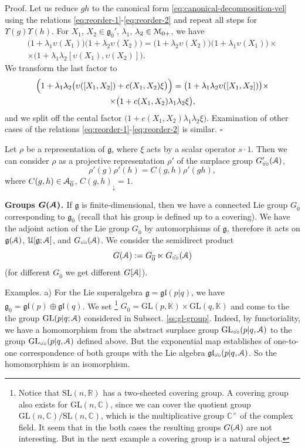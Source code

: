 \documentclass[]{amsart}
\newcounter{sec}
\newcounter{punct}[sec]
\def\punct{\refstepcounter{punct}{\arabic{sec}.\arabic{punct}.  }}
\def\SL{\mathrm {SL}}
\def\GL{\mathrm  {GL}}
\def\cA{\EuScript A}
\def\cM{\EuScript M}
\def\cU{\EuScript U}
\def\frg{\mathfrak g}
\def\frl{\mathfrak l}
\def\R {{\mathbb R }}
\def\C {{\mathbb C }}
\def\K{{\mathbb K}}
\def\ov{\overline}
\def\sm{\smallskip}
\def\0{{\ov 0}}
\def\vel{{\check{\circ\circ}}}
\begin{document}
 {\sc Proof.}  Let us reduce $gh$ to the canonical form \eqref{eq:canonical-decomposition-vel}
 using the relations \eqref{eq:reorder-1}-\eqref{eq:reorder-2} and repeat all steps for 
 $\Upsilon(g)\Upsilon(h)$. For $X_1$, $X_2\in \frg_\0'$, $\lambda_1$, $\lambda_2\in\cM_{0+}$,
    we have 
 \begin{multline*}
 	\bigl(1+\lambda_1\upsilon(X_1)\bigr)\bigl(1+\lambda_2\upsilon(X_2)\bigr)  =\bigl(1+\lambda_2\upsilon(X_2)\bigr)\bigl(1+\lambda_1\upsilon(X_1)\bigr)
 	\times\\\times 
 \bigl(1+\lambda_1\lambda_2[\upsilon(X_1),\upsilon(X_2)]\bigr).
 \end{multline*}
 We transform the last factor to
 \begin{multline*}
 \Bigl(1+\lambda_1\lambda_2\bigl(\upsilon ([X_1,X_2])+c(X_1,X_2)\xi\bigr)\Bigr)=
  \bigl(1+\lambda_1\lambda_2 \upsilon([X_1,X_2])\bigr) 
  \times\\ \times \bigl(1+c(X_1,X_2)\lambda_1\lambda_2\xi\bigr),
 \end{multline*}
and we split off the cental factor $\bigl(1+c(X_1,X_2)\lambda_1\lambda_2\xi\bigr)$.
Examination of other cases of the relations  \eqref{eq:reorder-1}-\eqref{eq:reorder-2}
is similar.
\hfill $\square$



\sm

Let $\rho$ be a representation of $\frg$, where $\xi$ acts by a scalar operator $s\cdot 1$. 
Then we can  consider  
$\rho$ as a projective representation $\rho'$ of the surplace group $G'_\vel(\cA)$,
$$
\rho'(g)\rho'(h)=C(g,h)\rho'(gh),
$$ 
where $C(g,h)\in \cA_\0$, $C(g,h)_\downarrow=1$.

\sm

{\bf\punct Groups $\boldsymbol{G(\cA)}$.%
\label{ss:supergroups}} If $\frg$ is finite-dimensional, then we 
have a connected Lie group $G_\0$ corresponding to $\frg_\0$
(recall that his group
is defined up to a covering). 
 We have the adjoint action of the Lie group $G_\0$  by automorphisms of 
 $\frg$, therefore it acts on $\frg(\cA)$, $\cU[\frg;\cA]$,
 and
  $G_\vel(\cA)$. We consider
the semidirect product
$$
G(\cA):=G_\0\ltimes G_\vel(\cA)
$$
(for different $G_\0$ we get different 
$G[\cA]$).




\sm

{\sc Examples.} a) For the Lie superalgebra
$\frg=\frg\frl(p|q)$, we have $\frg_\0=\frg\frl(p)\oplus \frg\frl(q)$.
We set%
\footnote{Notice  that $\SL(n,\R)$ has a two-sheeted covering group.
A covering group also exists for $\GL(n,\C)$, since we can cover 
the quotient group
$\GL(n,\C)/\SL(n,\C)$, which is the multiplicative group
$\C^\times$ of the complex field. It seem that in the  both cases
the resulting groups $G(\cA)$ 
are not interesting. But in the next example a covering group
is a natural object.}
 $G_\0=\GL(p,\K)\times \GL(q,\K)$ and come to the
 the group $\GL(p|q;\cA)$
considered in Subsect. \ref{ss:gl-group}.
Indeed, by functoriality, we have a homomorphism from
the abstract surplace group $\GL_\vel(p|q,\cA)$
to the group $\GL_\vel(p|q,\cA)$ defined above. But the exponential
map establishes of one-to-one correspondence of both groups
with the Lie algebra $\frg\frl_\vel(p|q,\cA)$. So the homomorphism is
an isomorphism. 
\end{document}
